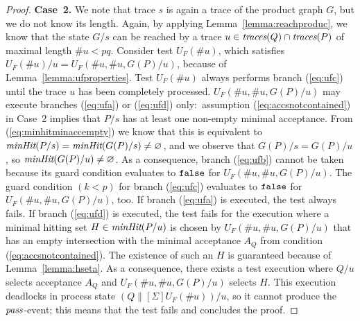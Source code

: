\begin{proof}
\medskip
\noindent
{\bf Case~2.} We note that trace $s$ is again a trace of the product graph
$G$, but we do not know its length. Again, by applying Lemma~\ref{lemma:reachproduc},
we know that the state   $G/s$ can   be reached by a trace
$u\in\text{\it traces}(Q)\cap\text{\it traces}(P)$ of maximal length $\#u < pq$. Consider test $U_F(\#
u)$, which satisfies $U_F(\# u)/u = U_F(\#u,\#u,G(P)/u)$, because of Lemma~\ref{lemma:ufproperties}. Test $U_F(\#u)$   always performs
branch (\ref{eq:ufc}) until the trace $u$ has been completely processed.
$U_F(\#u,\#u,G(P)/u)$ may execute branches (\ref{eq:ufa}) or (\ref{eq:ufd})
only:~assumption (\ref{eq:accsnotcontained}) in Case~2 implies that $P/s$ has
at least one non-empty minimal acceptance. From (\ref{eq:minhitminaccempty}) 
we know that this is equivalent to $\text{\it minHit}(P/s) = \text{\it minHit}(G(P)/s)\neq\varnothing$, and
we observe that $G(P)/s = G(P)/u$, so $\text{\it minHit}(G(P)/u)\neq\varnothing$.
As a consequence, branch (\ref{eq:ufb}) cannot be taken because its guard condition
evaluates to $\mbox{{\tt false}}$  for $U_F(\#u,\#u,G(P)/u)$.
The guard condition $(k < p)$ for branch (\ref{eq:ufc}) evaluates
to $\mbox{{\tt false}}$ for $U_F(\#u,\#u,G(P)/u)$, too. If branch (\ref{eq:ufa}) is executed, the
test always fails. If branch (\ref{eq:ufd}) is executed, the test fails for
the execution where a minimal hitting set $H\in\text{\it minHit}(P/u)$ is chosen
by $U_F(\#u,\#u,G(P)/u)$ that has an empty intersection with the minimal acceptance
$A_Q$ from condition (\ref{eq:accsnotcontained}). The existence of such an
$H$ is guaranteed because of Lemma~\ref{lemma:hseta}. As a consequence, there
exists a test execution   where $Q/u$ selects acceptance $A_Q$ and
$U_F(\#u,\#u,G(P)/u)$ selects $H$. This execution deadlocks in process state
$(Q\parallel[\Sigma]U_F(\# u))/u$, so it cannot produce the ${\text{\it pass}}$-event;
this  means that the test fails and concludes the proof. 
\xbox
\end{proof}


